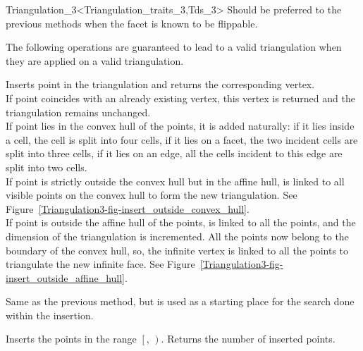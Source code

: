 \begin{ccRefClass}{Triangulation_3<Triangulation_traits_3,Tds_3>}
\ccGlue
{}
{Should be preferred to the previous methods when the facet is
known to be flippable.
}


The following operations are guaranteed to lead to a valid triangulation 
when they are applied on a valid triangulation.

{Inserts point  in the triangulation and returns the corresponding
 vertex.\\
If point  coincides with an already existing vertex, this 
vertex is returned and the triangulation remains unchanged.\\
If point  lies in the convex hull of the points, it is added
naturally: if it lies inside a cell, the cell is split into four
cells, if it lies on a facet, the two incident cells are split into
three cells, if it lies on an edge, all the cells incident to this
edge are split into two cells.\\
If point  is strictly outside the convex hull but in the affine
hull,  is linked to all visible points on the convex hull to
form the new triangulation. See
Figure~\ref{Triangulation3-fig-insert_outside_convex_hull}.\\  
If point  is outside the affine hull of the points,  is
linked to all the points, and the dimension of the triangulation is
incremented. All the points now belong to the boundary of the convex
hull, so, the infinite vertex is linked to all the points to
triangulate the new infinite face. See 
Figure~\ref{Triangulation3-fig-insert_outside_affine_hull}.}

{Same as the previous method, but  is used as a starting
place for the search done within the insertion.}

{Inserts the points in the range $\left[\right.$,
$\left.\right)$.  Returns the number of inserted points.
}


\end{ccRefClass}
